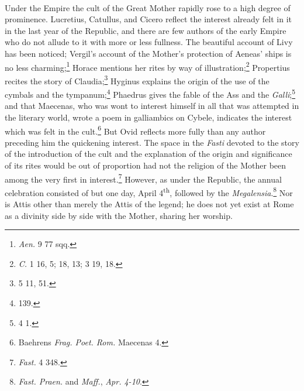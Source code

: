 \documentclass[a4paper, 11pt, oneside, polutonikogreek, french]{article}
\begin{document}
\paragraph{}
Under the Empire the cult of the Great Mother rapidly rose to a high degree of prominence. Lucretius, Catullus, and Cicero reflect the interest already felt in it in the last year of the Republic, and there are few authors of the early Empire who do not allude to it with more or less fullness. The beautiful account of Livy has been noticed; Vergil's account of the Mother's protection of Aeneas' ships is no less charming;\footnote{\emph{Aen.} 9 77 sqq.} Horace mentions her rites by way of illustration;\footnote{\emph{C.} 1 16, 5; 18, 13; 3 19, 18.} Propertius recites the story of Claudia;\footnote{5 11, 51.} Hyginus explains the origin of the use of the cymbals and the tympanum;\footnote{139.} Phaedrus gives the fable of the Ass and the \emph{Galli};\footnote{4 1.} and that Maecenas, who was wont to interest himself in all that was attempted in the literary world, wrote a poem in galliambics on Cybele, indicates the interest which was felt in the cult.\footnote{Baehrens \emph{Frag. Poet. Rom.} Maecenas 4.} But Ovid reflects more fully than any author preceding him the quickening interest. The space in the \emph{Fasti} devoted to the story of the introduction of the cult and the explanation of the origin and significance of its rites would be out of proportion had not the religion of the Mother been among the very first in interest.\footnote{\emph{Fast.} 4 348.} However, as under the Republic, the annual celebration consisted of but one day, April 4\textsuperscript{th}, followed by the \emph{Megalensia}.\footnote{\emph{Fast. Praen.} and \emph{Maff.}, \emph{Apr. 4-10}.} Nor is Attis other than merely the Attis of the legend; he does not yet exist at Rome as a divinity side by side with the Mother, sharing her worship.
\end{document}
